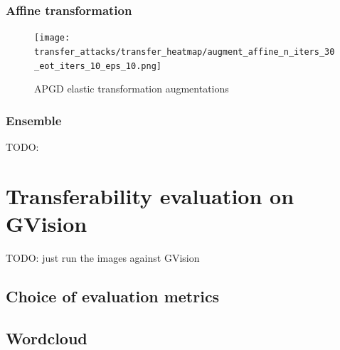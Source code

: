 \subsubsection{Affine transformation}

\begin{figure}
    \centering
    \texttt{[image: transfer\_attacks/transfer\_heatmap/augment\_affine\_n\_iters\_30\_eot\_iters\_10\_eps\_10.png]}
    \caption{APGD elastic transformation augmentations}
    \label{fig:apgd_affine}
\end{figure}


\subsubsection{Ensemble}
TODO:


\section{Transferability evaluation on GVision}
TODO: just run the images against GVision

\subsection{Choice of evaluation metrics}

\subsection{Wordcloud}